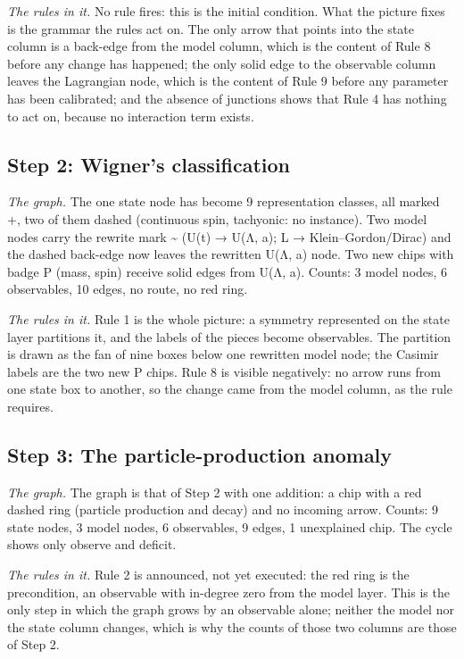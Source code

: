 \noindent\emph{The rules in it.} No rule fires: this is the initial condition. What the picture fixes is the grammar the rules act on. The only arrow that points into the state column is a back-edge from the model column, which is the content of Rule 8 before any change has happened; the only solid edge to the observable column leaves the Lagrangian node, which is the content of Rule 9 before any parameter has been calibrated; and the absence of junctions shows that Rule 4 has nothing to act on, because no interaction term exists.

\subsection*{Step 2: Wigner's classification}
\noindent\emph{The graph.} The one state node has become 9 representation classes, all marked +, two of them dashed (continuous spin, tachyonic: no instance). Two model nodes carry the rewrite mark \textasciitilde{} (U(t) → U(Λ, a); L → Klein–Gordon/Dirac) and the dashed back-edge now leaves the rewritten U(Λ, a) node. Two new chips with badge P (mass, spin) receive solid edges from U(Λ, a). Counts: 3 model nodes, 6 observables, 10 edges, no route, no red ring.

\noindent\emph{The rules in it.} Rule 1 is the whole picture: a symmetry represented on the state layer partitions it, and the labels of the pieces become observables. The partition is drawn as the fan of nine boxes below one rewritten model node; the Casimir labels are the two new P chips. Rule 8 is visible negatively: no arrow runs from one state box to another, so the change came from the model column, as the rule requires.

\subsection*{Step 3: The particle-production anomaly}
\noindent\emph{The graph.} The graph is that of Step 2 with one addition: a chip with a red dashed ring (particle production and decay) and no incoming arrow. Counts: 9 state nodes, 3 model nodes, 6 observables, 9 edges, 1 unexplained chip. The cycle shows only observe and deficit.

\noindent\emph{The rules in it.} Rule 2 is announced, not yet executed: the red ring is the precondition, an observable with in-degree zero from the model layer. This is the only step in which the graph grows by an observable alone; neither the model nor the state column changes, which is why the counts of those two columns are those of Step 2.

